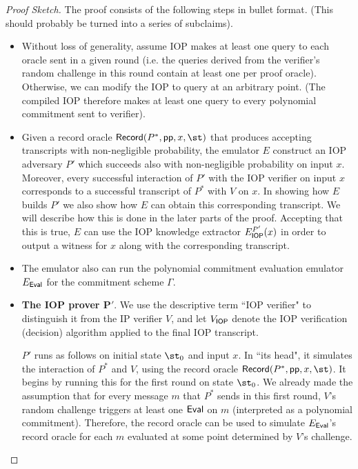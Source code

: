 \begin{proof}[Proof Sketch]

The proof consists of the following steps in bullet format. (This should probably be turned into a series of subclaims).  

\begin{itemize}

\item Without loss of generality, assume IOP makes at least one query to each oracle sent in a given round (i.e. the queries derived from the verifier's random challenge in this round contain at least one per proof oracle). Otherwise, we can modify the IOP to query at an arbitrary point. (The compiled IOP therefore makes at least one query to every polynomial commitment sent to verifier). 
 
\item Given a record oracle $\pro{Record}(P^*, \params, x, \st)$ that produces accepting transcripts with non-negligible probability, the emulator $E$ construct an IOP adversary $P'$ which succeeds also with non-negligible probability on input $x$. Moreover, every successful interaction of $P'$ with the IOP verifier on input $x$ corresponds to a successful transcript of $P^*$ with $V$ on $x$. In showing how $E$ builds $P'$ we also show how $E$ can obtain this corresponding transcript. We will describe how this is done in the later parts of the proof. Accepting that this is true, $E$ can use the IOP knowledge extractor $E_{\textsf{{IOP}}}^{P'}(x)$ in order to output a witness for $x$ along with the corresponding transcript. 

\item The emulator also can run the polynomial commitment evaluation emulator $E_{\textsf{{Eval}}}$ for the commitment scheme $\Gamma$. 

\item  \textbf{The IOP prover $\mathbf{P'}$}. We use the descriptive term ``IOP verifier" to distinguish it from the IP verifier $V$, and let $V_{\textsf{{IOP}}}$ denote the IOP verification (decision) algorithm applied to the final IOP transcript. 

$P'$ runs as follows on initial state $\st_0$ and input $x$. In ``its head", it simulates the interaction of $P^*$ and $V$, using the record oracle $\pro{Record}(P^*, \params, x, \st)$. It begins by running this for the first round on state $\st_0$. We already made the assumption that for every message $m$ that $P^*$ sends in this first round, $V$'s random challenge triggers at least one $\textsf{{Eval}}$ on $m$ (interpreted as a polynomial commitment). Therefore, the record oracle can be used to simulate $E_{\textsf{{Eval}}}$'s record oracle for each $m$ evaluated at some point determined by $V$'s challenge.


\end{itemize}
\end{proof}
